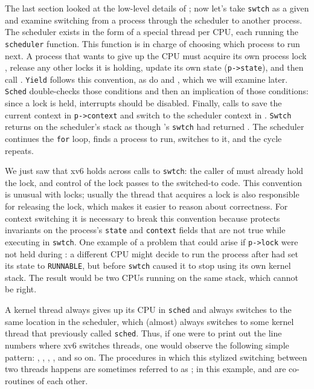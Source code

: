 The last section looked at the low-level details of
;
now let's take 
\lstinline{swtch}
as a given and examine 
switching from a process through the scheduler to another process.
The scheduler exists in the form of a special thread per CPU, each running the
\lstinline{scheduler}
function.
This function is in charge of choosing which process to run next.
A process
that wants to give up the CPU must
acquire its own process lock
,
release any other locks it is holding,
update its own state
(\lstinline{p->state}),
and then call
.
\lstinline{Yield}
follows this convention, as do
and
,
which we will examine later.
\lstinline{Sched}
double-checks those conditions
and then an implication of those conditions:
since a lock is held, interrupts should be disabled.
Finally,
calls
to save the current context in 
\lstinline{p->context}
and switch to the scheduler context in
.
\lstinline{Swtch}
returns on the scheduler's stack
as though
's
\lstinline{swtch}
had returned
.
The scheduler continues the 
\lstinline{for}
loop, finds a process to run, 
switches to it, and the cycle repeats.

We just saw that xv6 holds
across calls to
\lstinline{swtch}:
the caller of
must already hold the lock, and control of the lock passes to the
switched-to code.  This convention is unusual with locks; usually
the thread that acquires a lock is also responsible for
releasing the lock, which makes it easier to reason about correctness.
For context switching it is necessary to break this convention because
protects invariants on the process's
\lstinline{state}
and
\lstinline{context}
fields that are not true while executing in
\lstinline{swtch}.
One example of a problem that could arise if
\lstinline{p->lock}
were not held during
:
a different CPU might decide
to run the process after 
had set its state to
\lstinline{RUNNABLE},
but before 
\lstinline{swtch}
caused it to stop using its own kernel stack.
The result would be two CPUs running on the same stack,
which cannot be right.

A kernel thread always gives up its
CPU in
\lstinline{sched} 
and always switches to the same location in the scheduler, which
(almost) always switches to some kernel thread that previously called
\lstinline{sched}. 
Thus, if one were to print out the line numbers where xv6 switches
threads, one would observe the following simple pattern:
,
,
,
,
and so on.  The procedures in which this stylized switching between
two threads happens are sometimes referred to as 
; 
in this example,
and
are co-routines of each other.

